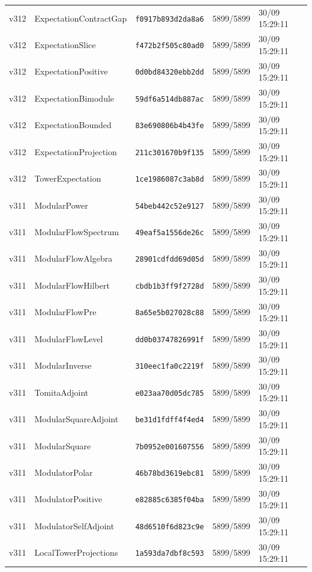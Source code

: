 \documentclass[11pt]{article}
\theoremstyle{definition}\newtheorem{deriv}{Derivação}
\begin{document}
{\begin{longtable}{@{}lllll@{}}
v312 & ExpectationContractGap & \texttt{f0917b893d2da8a6} & 5899/5899 & 30/09 15:29:11 \\
v312 & ExpectationSlice & \texttt{f472b2f505c80ad0} & 5899/5899 & 30/09 15:29:11 \\
v312 & ExpectationPositive & \texttt{0d0bd84320ebb2dd} & 5899/5899 & 30/09 15:29:11 \\
v312 & ExpectationBimodule & \texttt{59df6a514db887ac} & 5899/5899 & 30/09 15:29:11 \\
v312 & ExpectationBounded & \texttt{83e690806b4b43fe} & 5899/5899 & 30/09 15:29:11 \\
v312 & ExpectationProjection & \texttt{211c301670b9f135} & 5899/5899 & 30/09 15:29:11 \\
v312 & TowerExpectation & \texttt{1ce1986087c3ab8d} & 5899/5899 & 30/09 15:29:11 \\
v311 & ModularPower & \texttt{54beb442c52e9127} & 5899/5899 & 30/09 15:29:11 \\
v311 & ModularFlowSpectrum & \texttt{49eaf5a1556de26c} & 5899/5899 & 30/09 15:29:11 \\
v311 & ModularFlowAlgebra & \texttt{28901cdfdd69d05d} & 5899/5899 & 30/09 15:29:11 \\
v311 & ModularFlowHilbert & \texttt{cbdb1b3ff9f2728d} & 5899/5899 & 30/09 15:29:11 \\
v311 & ModularFlowPre & \texttt{8a65e5b027028c88} & 5899/5899 & 30/09 15:29:11 \\
v311 & ModularFlowLevel & \texttt{dd0b03747826991f} & 5899/5899 & 30/09 15:29:11 \\
v311 & ModularInverse & \texttt{310eec1fa0c2219f} & 5899/5899 & 30/09 15:29:11 \\
v311 & TomitaAdjoint & \texttt{e023aa70d05dc785} & 5899/5899 & 30/09 15:29:11 \\
v311 & ModularSquareAdjoint & \texttt{be31d1fdff4f4ed4} & 5899/5899 & 30/09 15:29:11 \\
v311 & ModularSquare & \texttt{7b0952e001607556} & 5899/5899 & 30/09 15:29:11 \\
v311 & ModulatorPolar & \texttt{46b78bd3619ebc81} & 5899/5899 & 30/09 15:29:11 \\
v311 & ModulatorPositive & \texttt{e82885c6385f04ba} & 5899/5899 & 30/09 15:29:11 \\
v311 & ModulatorSelfAdjoint & \texttt{48d6510f6d823c9e} & 5899/5899 & 30/09 15:29:11 \\
v311 & LocalTowerProjections & \texttt{1a593da7dbf8c593} & 5899/5899 & 30/09 15:29:11 \\

\end{longtable}}
\end{document}
